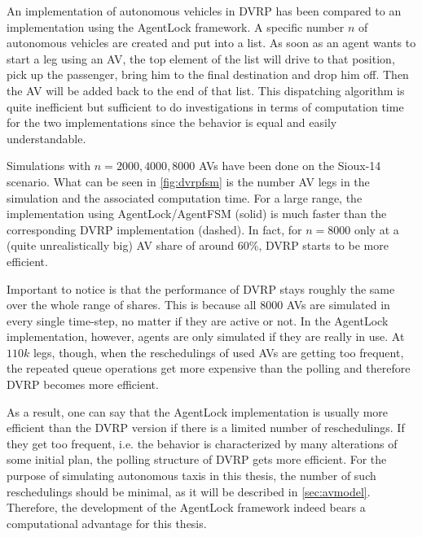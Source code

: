An implementation of autonomous vehicles in DVRP has been compared to an implementation
using the AgentLock framework. A specific number $n$ of
autonomous vehicles are created and put into a list. As soon as an agent wants to
start a leg using an AV, the top element of the list will drive to that position,
pick up the passenger, bring him to the final destination and drop him off. Then
the AV will be added back to the end of that list. This dispatching algorithm is
quite inefficient but sufficient to do investigations in terms
of computation time for the two implementations since the behavior is equal and
easily understandable.

Simulations with $n=2000, 4000, 8000$ AVs have been done on the Sioux-14 scenario. What can be seen in \cref{fig:dvrpfsm}
is the number AV legs in the simulation and the associated computation
time. For a large range, the implementation using AgentLock/AgentFSM (solid)
is much faster than the corresponding DVRP implementation (dashed). In fact, for $n=8000$
only at a (quite unrealistically big) AV share of around 60\%, DVRP starts to be more efficient.

Important to notice is that the performance of DVRP stays roughly the same over
the whole range of shares. This is because all 8000 AVs are simulated
in every single time-step, no matter if they are active or not. In the AgentLock
implementation, however, agents are only simulated if they are really in use. At
$110k$ legs, though, when the reschedulings of used AVs are getting too frequent, the repeated
queue operations get more expensive than the polling and therefore DVRP becomes more efficient.

As a result, one can say that the AgentLock implementation is usually more efficient
than the DVRP version if there is a limited number of reschedulings. If they get
too frequent, i.e. the behavior is characterized by many alterations of some
initial plan, the polling structure of DVRP gets more efficient. For the purpose
of simulating autonomous taxis in this thesis, the number of such reschedulings
should be minimal, as it will be described in \cref{sec:avmodel}. Therefore, the
development of the AgentLock framework indeed bears a computational advantage for
this thesis.

